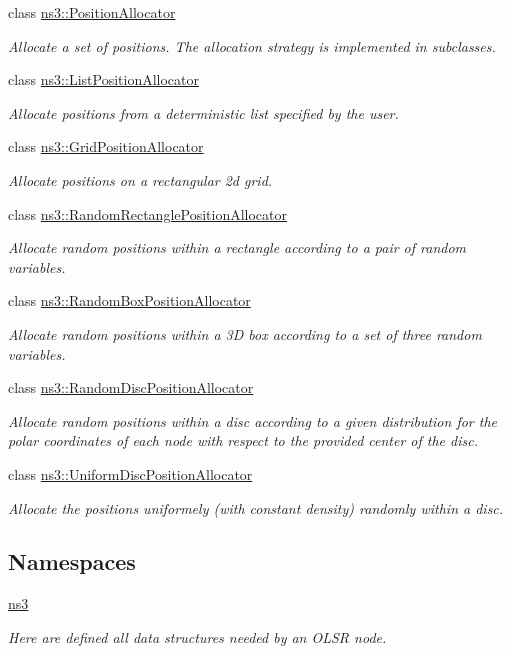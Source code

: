 \begin{DoxyCompactItemize}
\item 
class \hyperlink{classns3_1_1PositionAllocator}{ns3\+::\+Position\+Allocator}
\begin{DoxyCompactList}\small\item\em Allocate a set of positions. The allocation strategy is implemented in subclasses. \end{DoxyCompactList}\item 
class \hyperlink{classns3_1_1ListPositionAllocator}{ns3\+::\+List\+Position\+Allocator}
\begin{DoxyCompactList}\small\item\em Allocate positions from a deterministic list specified by the user. \end{DoxyCompactList}\item 
class \hyperlink{classns3_1_1GridPositionAllocator}{ns3\+::\+Grid\+Position\+Allocator}
\begin{DoxyCompactList}\small\item\em Allocate positions on a rectangular 2d grid. \end{DoxyCompactList}\item 
class \hyperlink{classns3_1_1RandomRectanglePositionAllocator}{ns3\+::\+Random\+Rectangle\+Position\+Allocator}
\begin{DoxyCompactList}\small\item\em Allocate random positions within a rectangle according to a pair of random variables. \end{DoxyCompactList}\item 
class \hyperlink{classns3_1_1RandomBoxPositionAllocator}{ns3\+::\+Random\+Box\+Position\+Allocator}
\begin{DoxyCompactList}\small\item\em Allocate random positions within a 3D box according to a set of three random variables. \end{DoxyCompactList}\item 
class \hyperlink{classns3_1_1RandomDiscPositionAllocator}{ns3\+::\+Random\+Disc\+Position\+Allocator}
\begin{DoxyCompactList}\small\item\em Allocate random positions within a disc according to a given distribution for the polar coordinates of each node with respect to the provided center of the disc. \end{DoxyCompactList}\item 
class \hyperlink{classns3_1_1UniformDiscPositionAllocator}{ns3\+::\+Uniform\+Disc\+Position\+Allocator}
\begin{DoxyCompactList}\small\item\em Allocate the positions uniformely (with constant density) randomly within a disc. \end{DoxyCompactList}\end{DoxyCompactItemize}
\subsection*{Namespaces}
\begin{DoxyCompactItemize}
\item 
 \hyperlink{namespacens3}{ns3}
\begin{DoxyCompactList}\small\item\em Here are defined all data structures needed by an O\+L\+SR node. \end{DoxyCompactList}\end{DoxyCompactItemize}
